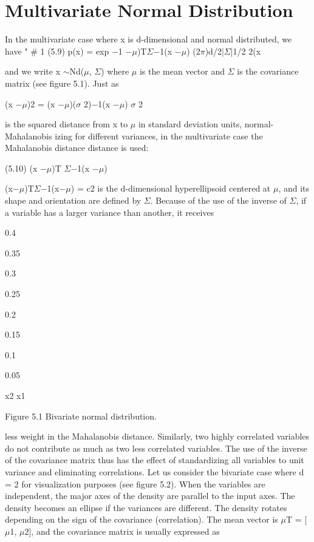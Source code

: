 \section{Multivariate Normal Distribution}

In the multivariate case where x is d-dimensional and normal distributed, we have " \# 1 (5.9) p(x) = exp $-$1 $-$$\mu$)T$\Sigma$$-$1(x $-$$\mu$) (2$\pi$)d/2|$\Sigma$|1/2 2(x

and we write x $\sim$Nd($\mu$, $\Sigma$) where $\mu$ is the mean vector and $\Sigma$ is the covariance matrix (see figure 5.1). Just as

(x $-$$\mu$)2 = (x $-$$\mu$)($\sigma$ 2)$-$1(x $-$$\mu$) $\sigma$ 2

is the squared distance from x to $\mu$ in standard deviation units, normal- Mahalanobis izing for different variances, in the multivariate case the Mahalanobis distance distance is used:

(5.10) (x $-$$\mu$)T $\Sigma$$-$1(x $-$$\mu$)

(x$-$$\mu$)T$\Sigma$$-$1(x$-$$\mu$) = c2 is the d-dimensional hyperellipsoid centered at $\mu$, and its shape and orientation are defined by $\Sigma$. Because of the use of the inverse of $\Sigma$, if a variable has a larger variance than another, it receives

0.4

0.35

0.3

0.25

0.2

0.15

0.1

0.05

x2 x1

Figure 5.1 Bivariate normal distribution.

less weight in the Mahalanobis distance. Similarly, two highly correlated variables do not contribute as much as two less correlated variables. The use of the inverse of the covariance matrix thus has the effect of standardizing all variables to unit variance and eliminating correlations. Let us consider the bivariate case where d = 2 for visualization purposes (see figure 5.2). When the variables are independent, the major axes of the density are parallel to the input axes. The density becomes an ellipse if the variances are different. The density rotates depending on the sign of the covariance (correlation). The mean vector is $\mu$T = [$\mu$1, $\mu$2], and the covariance matrix is usually expressed as

